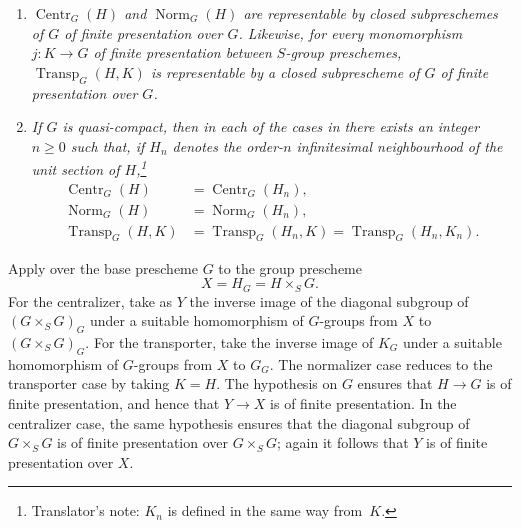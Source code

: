 \begin{enumerate}
\item[(a)] %
\textit{\(\operatorname{Centr}_G(H)\) and
\(\operatorname{Norm}_G(H)\) are representable by closed
subpreschemes of \(G\) of finite presentation over \(G\).  Likewise,
for every monomorphism \(j:K\to G\) of finite presentation between
\(S\)-group preschemes, \(\operatorname{Transp}_G(H,K)\) is
representable by a closed subprescheme of \(G\) of finite
presentation over \(G\).}

\item[(b)] %
\textit{If \(G\) is quasi-compact, then in each of the cases in
 there exists an integer \(n\geq0\) such that, if \(H_n\)
denotes the order-\(n\) infinitesimal neighbourhood of the unit
section of \(H\),\footnote{Translator's note: \(K_n\) is defined in the same way
from~\(K\).}}
\[
  \begin{aligned}
  \operatorname{Centr}_G(H)
    &=\operatorname{Centr}_G(H_n),\\
  \operatorname{Norm}_G(H)
    &=\operatorname{Norm}_G(H_n),\\
  \operatorname{Transp}_G(H,K)
    &=\operatorname{Transp}_G(H_n,K)
     =\operatorname{Transp}_G(H_n,K_n).
  \end{aligned}
\]
\end{enumerate}

Apply  over the base
prescheme \(G\) to the group prescheme
\[
  X=H_G=H\times_SG.
\]
For the centralizer, take as \(Y\) the inverse image of the diagonal
subgroup of \((G\times_SG)_G\) under a suitable homomorphism of
\(G\)-groups from \(X\) to \((G\times_SG)_G\).  For the transporter,
take the inverse image of \(K_G\) under a suitable homomorphism of
\(G\)-groups from \(X\) to \(G_G\).  The normalizer case reduces to
the transporter case by taking \(K=H\).  The hypothesis on \(G\)
ensures that \(H\to G\) is of finite presentation, and hence that
\(Y\to X\) is of finite presentation.  In the centralizer case, the
same hypothesis ensures that the diagonal subgroup of
\(G\times_SG\) is of finite presentation over \(G\times_SG\);
again it follows that \(Y\) is of finite presentation over \(X\).

